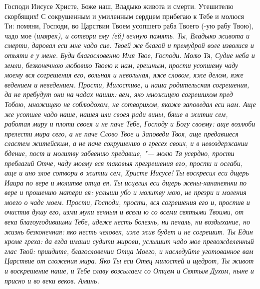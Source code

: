 Господи Иисусе Христе, Боже наш, Владыко живота и смерти. Утешителю скорбящих! С сокрушенным и умиленным сердцем прибегаю к Тебе и молюся Ти: помяни, Господи, во Царствии Твоем усопшего раба Твоего (-ую рабу Твою), чадо мое (\itshape имярек\normalfont{}), и сотвори ему (ей) вечную память. Ты, Владыко живота и смерти, даровал еси мне чадо сие. Твоей же благой и премудрой воле изволися и отьяти е у мене. Буди благословенно Имя Твое, Господи. Молю Тя, Судие неба и земли, безконечною любовию Твоею к нам, грешным, прости усопшему чаду моему вся согрешения его, вольная и невольная, яже словом, яже делом, яже ведением и неведением. Прости, Милостиве, и наша родительская согрешения, да не пребудут они на чадах наших: вем, яко множицею согрешихом пред Тобою, множицею не соблюдохом, не сотворихом, якоже заповедал еси нам. Аще же усопшее чадо наше, нашея или своея ради вины, бяше в житии сем, работая миру и плоти своея и не паче Тебе, Господу и Богу своему: аще возлюби прелести мира сего, а не паче Слово Твое и Заповеди Твоя, аще предавшеся сластем житейским, а не паче сокрушению о гресех своих, и в невоздержании бдение, пост и молитву забвению предавше, "--- молю Тя усердно, прости преблагий Отче, чаду моему вся таковыя прегрешения его, прости и ослаби, аще и ино злое сотвори в житии сем, Христе Иисусе! Ты воскресил еси дщерь Иаира по вере и молитве отца ея. Ты исцелил еси дщерь жены-хананеянки по вере и прошению матери ея: услыши убо и молитву мою, не презри и моления моего о чаде моем. Прости, Господи, прости, вся согрешения его и, простив и очистив душу его, изми муки вечныя и всели ю со всеми святыми Твоими, от века благоугодившими Тебе, идеже несть болезнь, ни печаль, ни воздыхание, но жизнь безконечная: яко несть человек, иже жив будет и не согрешит. Ты Един кроме греха: да егда имаши судити мирови, услышит чадо мое превожделенный глас Твой: приидите, благословении Отца Моего, и наследуйте уготованное вам Царствие от сложения мира. Яко Ты еси Отец милостей и щедрот, Ты живот и воскрешение наше, и Тебе славу возсылаем со Отцем и Святым Духом, ныне и присно и во веки веков. Аминь. 





\mychapterending




